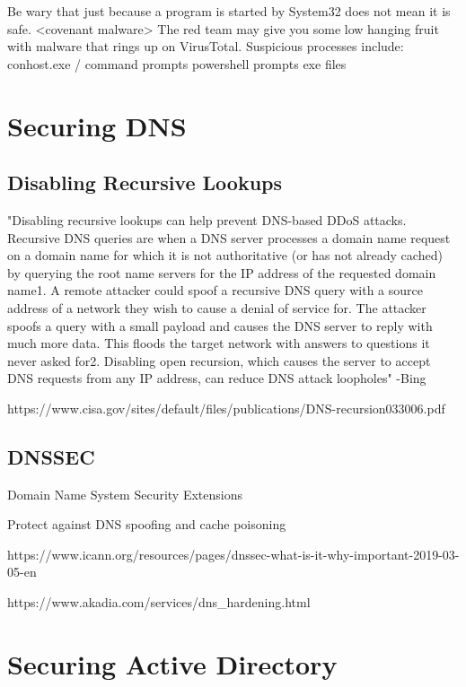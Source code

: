 \documentclass{article}
\begin{document}
Be wary that just because a program is started by System32 does not mean it is safe. <covenant malware>
The red team may give you some low hanging fruit with malware that rings up on VirusTotal.
Suspicious processes include:
conhost.exe / command prompts
powershell prompts
exe files

\section{Securing DNS}

\subsection{Disabling Recursive Lookups}
"Disabling recursive lookups can help prevent DNS-based DDoS attacks. 
Recursive DNS queries are when a DNS server processes a domain name 
request on a domain name for which it is not authoritative 
(or has not already cached) by querying the root name servers for 
the IP address of the requested domain name1. A remote attacker could 
spoof a recursive DNS query with a source address of a network they 
wish to cause a denial of service for. The attacker spoofs a query 
with a small payload and causes the DNS server to reply with much 
more data. This floods the target network with answers to questions 
it never asked for2. Disabling open recursion, which causes the server 
to accept DNS 
requests from any IP address, can reduce DNS attack loopholes" -Bing

https://www.cisa.gov/sites/default/files/publications/DNS-recursion033006.pdf

\subsection{DNSSEC}
Domain Name System Security Extensions

Protect against DNS spoofing and cache poisoning

https://www.icann.org/resources/pages/dnssec-what-is-it-why-important-2019-03-05-en

https://www.akadia.com/services/dns\_hardening.html

\section{Securing Active Directory}
\end{document}
